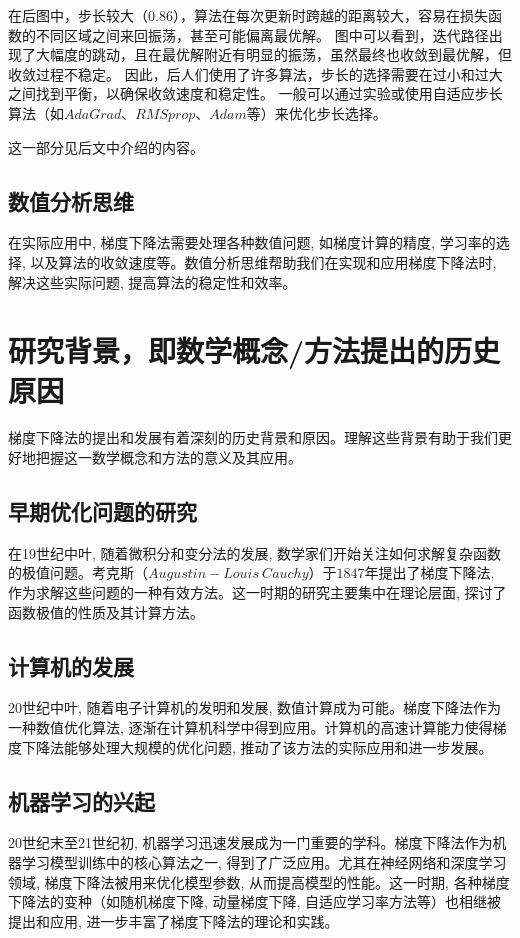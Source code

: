 \documentclass[printMode=true, declarePage=false]{ecnuthesis}
\begin{document}
    在后图中，步长较大（$0.86$），算法在每次更新时跨越的距离较大，容易在损失函数的不同区域之间来回振荡，甚至可能偏离最优解。
    图中可以看到，迭代路径出现了大幅度的跳动，且在最优解附近有明显的振荡，虽然最终也收敛到最优解，但收敛过程不稳定。
    因此，后人们使用了许多算法，步长的选择需要在过小和过大之间找到平衡，以确保收敛速度和稳定性。
    一般可以通过实验或使用自适应步长算法（如$AdaGrad、RMSprop、Adam$等）来优化步长选择。

    这一部分见后文中介绍的内容。

    \subsection{数值分析思维}
    在实际应用中, 梯度下降法需要处理各种数值问题, 如梯度计算的精度, 学习率的选择, 以及算法的收敛速度等。数值分析思维帮助我们在实现和应用梯度下降法时, 解决这些实际问题, 提高算法的稳定性和效率。


    \section{研究背景，即数学概念/方法提出的历史原因}

    梯度下降法的提出和发展有着深刻的历史背景和原因。理解这些背景有助于我们更好地把握这一数学概念和方法的意义及其应用。

    \subsection{早期优化问题的研究}
    在19世纪中叶, 随着微积分和变分法的发展, 数学家们开始关注如何求解复杂函数的极值问题。考克斯（$Augustin-Louis\ Cauchy$）于$1847$年提出了梯度下降法, 作为求解这些问题的一种有效方法。这一时期的研究主要集中在理论层面, 探讨了函数极值的性质及其计算方法。

    \subsection{计算机的发展}
    20世纪中叶, 随着电子计算机的发明和发展, 数值计算成为可能。梯度下降法作为一种数值优化算法, 逐渐在计算机科学中得到应用。计算机的高速计算能力使得梯度下降法能够处理大规模的优化问题, 推动了该方法的实际应用和进一步发展。

    \subsection{机器学习的兴起}
    20世纪末至21世纪初, 机器学习迅速发展成为一门重要的学科。梯度下降法作为机器学习模型训练中的核心算法之一, 得到了广泛应用。尤其在神经网络和深度学习领域, 梯度下降法被用来优化模型参数, 从而提高模型的性能。这一时期, 各种梯度下降法的变种（如随机梯度下降, 动量梯度下降, 自适应学习率方法等）也相继被提出和应用, 进一步丰富了梯度下降法的理论和实践。
\end{document}
